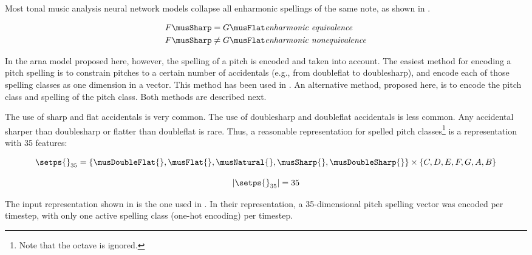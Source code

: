 
Most tonal music analysis neural network models collapse all
enharmonic spellings of the same note, as shown in
.

\begin{equation}
    \label{eq:enharmonicity}
    \begin{split}
    F\musSharp = G\musFlat & \textit{enharmonic equivalence} \\
    F\musSharp \neq G\musFlat & \textit{enharmonic nonequivalence} \\
    \end{split}
\end{equation}

In the \gls{arna} model proposed here, however, the spelling
of a pitch is encoded and taken into account. The easiest
method for encoding a pitch spelling is to constrain pitches
to a certain number of accidentals (e.g., from
\gls{doubleflat} to \gls{doublesharp}), and encode each of
those spelling classes as one dimension in a vector. This
method has been used in \textcite{micchi2020not,
micchi2021deep}. An alternative method, proposed here, is to
encode the pitch class and spelling of the pitch class. Both
methods are described next.


The use of \gls{sharp} and \gls{flat} accidentals is very
common. The use of \gls{doublesharp} and \gls{doubleflat}
accidentals is less common. Any accidental sharper than
\gls{doublesharp} or flatter than \gls{doubleflat} is rare.
Thus, a reasonable representation for spelled pitch
classes\footnote{Note that the octave is ignored.} is a
representation with 35 features:

\begin{equation}
    \label{eq:pitch_spelling_35}
    \setps{}_{35} = \{\musDoubleFlat{}, \musFlat{}, 
    \musNatural{}, \musSharp{}, \musDoubleSharp{} \}
    \times 
    \{C, D, E, F, G, A, B \}
\end{equation}

\begin{equation}
    \label{eq:pitch_spelling_35_magnitude}
    | \setps{}_{35} | = 35
\end{equation}

The input representation shown in 
is the one used in \textcite{micchi2020not, micchi2021deep}.
In their representation, a 35-dimensional pitch spelling
vector was encoded per timestep, with only one active
spelling class (one-hot encoding) per timestep.

